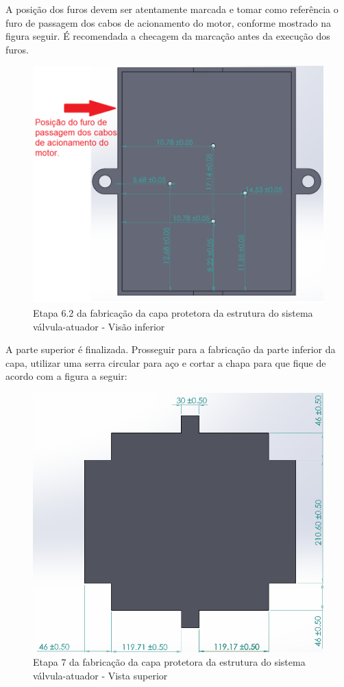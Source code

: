 A posição dos furos devem ser atentamente marcada e tomar como referência o furo de passagem dos cabos de acionamento do motor, conforme mostrado na figura seguir. É recomendada a checagem da marcação antes da execução dos furos.
\begin{figure} [H]
    \centering
    \includegraphics[width=.6\textwidth]{Figuras/montagemAbastecimento/capa/etapa6_2.png}
    \caption{Etapa 6.2 da fabricação da capa protetora da estrutura do sistema válvula-atuador - Visão inferior}
    \label{fig:etapa6.2}
\end{figure}

A parte superior é finalizada. Prosseguir para a fabricação da parte inferior da capa, utilizar uma serra circular para aço e cortar a chapa para que fique de acordo com a figura a seguir:
\begin{figure} [H]
    \centering
    \includegraphics[width=.6\textwidth]{Figuras/montagemAbastecimento/capa/etapa7.png}
    \caption{Etapa 7 da fabricação da capa protetora da estrutura do sistema válvula-atuador - Vista superior}
    \label{fig:etapa7}
\end{figure}

